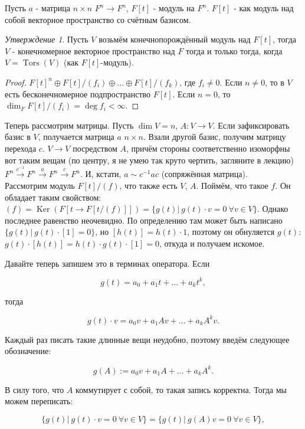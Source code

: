 \documentclass[a4paper,100pt]{article}
\theoremstyle{indented}
\theoremstyle{definition}
\theoremstyle{remark}
\newtheorem{stat}{Утверждение}
\DeclareMathOperator{\Ker}{Ker}
\DeclareMathOperator{\Tors}{Tors}
\begin{document}
Пусть $a$ - матрица $n\times n$ $F^n\rightarrow F^n$, $F[t]$ - модуль на $F^n$. $F[t]$ - как модуль над собой векторное пространство со счётным базисом.\ 


\begin{stat}
    Пусть $V$ возьмём конечнопорождённый модуль над $F[t]$, тогда $V$ - конечномерное векторное пространство над $F$ тогда и только тогда, когда $V=\Tors (V)$ (как $F[t]$-модуль).
\end{stat}

\begin{proof}
    $F[t]^n\oplus F[t]/(f_i)\oplus\ldots\oplus F[t]/(f_k)$, где $f_i\neq 0$. Если $n\neq 0$, то в $V$ есть бесконечномерное подпространство $F[t]$. Если $n=0$, то $\dim _F F[t]/(f_i)=\deg f_i < \infty$.
\end{proof}

Теперь рассмотрим матрицы. Пусть $\dim V =n $, $A: V\rightarrow V$. Если зафиксировать базис в $V$, получается матрица $a$ $n\times n$. Взали другой базис, получим матрицу перехода $c$. $V\rightarrow V$ посредством $A$, причём стороны соответственно изоморфны вот таким вещам (по центру, я не умею так круто чертить, загляните в лекцию) $F^n\xrightarrow{c^{-1}}F^n\xrightarrow{a}F^n\xrightarrow{c}F^n$. И, кстати, $a\sim c^{-1}ac$ (сопряжённая матрица).\\

Рассмотрим модуль $F[t]/(f)$, что также есть $V$, $A$. Поймём, что такое $f$. Он обладает таким свойством: $(f)=\Ker(F[t\rightarrow F[t/(f)]])=\{g(t)\vert \: g(t)\cdot v=0\: \forall v\in V\}$. Однако последнее равенство неочевидно. По определению там может быть написано $\{g(t)\vert \: g(t)\cdot [1]=0\}$, но $[h(t)]=h(t)\cdot 1$, поэтому он обнуляется $g(t)$: $g(t)\cdot[h(t)]=h(t)\cdot g(t)\cdot [1]=0$, откуда и получаем искомое. \ 

Давайте теперь запишем это в терминах оператора. Если 

\[
    g(t)=a_0+a_1t+\ldots+a_kt^k, 
\]

тогда 

\[
    g(t)\cdot v = a_0v+a_1Av+\ldots+a_kA^kv.
\]

Каждый раз писать такие длинные вещи неудобно, поэтому введём следующее обозначение: 

\[
    g(A):= a_0v+a_1A+\ldots+a_kA^k.
\]

В силу того, что $A$ коммутирует с собой, то такая запись корректна. Тогда мы можем переписать:

\[
    \{g(t)\vert \: g(t)\cdot v=0\: \forall v\in V\}=\{g(t)\vert \: g(A)v=0\: \forall v\in V\},
\]
\end{document}
